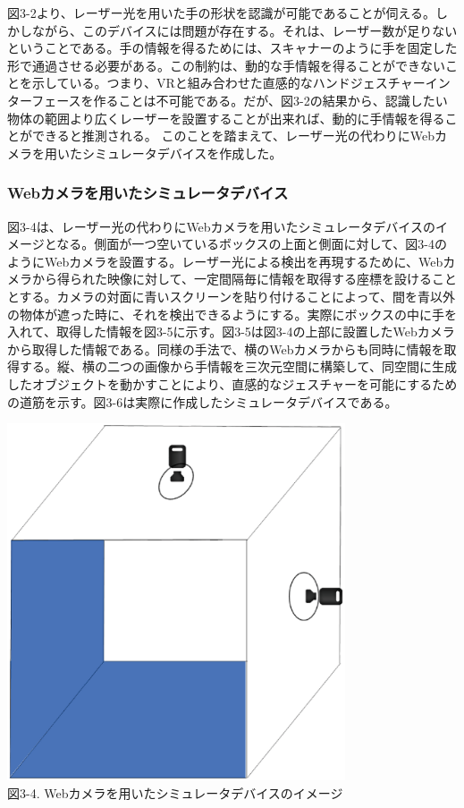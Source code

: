 図3-2より、レーザー光を用いた手の形状を認識が可能であることが伺える。しかしながら、このデバイスには問題が存在する。それは、レーザー数が足りないということである。手の情報を得るためには、スキャナーのように手を固定した形で通過させる必要がある。この制約は、動的な手情報を得ることができないことを示している。つまり、VRと組み合わせた直感的なハンドジェスチャーインターフェースを作ることは不可能である。だが、図3-2の結果から、認識したい物体の範囲より広くレーザーを設置することが出来れば、動的に手情報を得ることができると推測される。%
このことを踏まえて、レーザー光の代わりにWebカメラを用いたシミュレータデバイスを作成した。

\subsubsection{Webカメラを用いたシミュレータデバイス}
図3-4は、レーザー光の代わりにWebカメラを用いたシミュレータデバイスのイメージとなる。側面が一つ空いているボックスの上面と側面に対して、図3-4のようにWebカメラを設置する。レーザー光による検出を再現するために、Webカメラから得られた映像に対して、一定間隔毎に情報を取得する座標を設けることとする。カメラの対面に青いスクリーンを貼り付けることによって、間を青以外の物体が遮った時に、それを検出できるようにする。実際にボックスの中に手を入れて、取得した情報を図3-5に示す。図3-5は図3-4の上部に設置したWebカメラから取得した情報である。同様の手法で、横のWebカメラからも同時に情報を取得する。縦、横の二つの画像から手情報を三次元空間に構築して、同空間に生成したオブジェクトを動かすことにより、直感的なジェスチャーを可能にするための道筋を示す。図3-6は実際に作成したシミュレータデバイスである。

\begin{center}
  \includegraphics[width=10cm]{Simulator_image.eps} \\

 \vspace{1mm}
  図3-4. Webカメラを用いたシミュレータデバイスのイメージ
\end{center}

